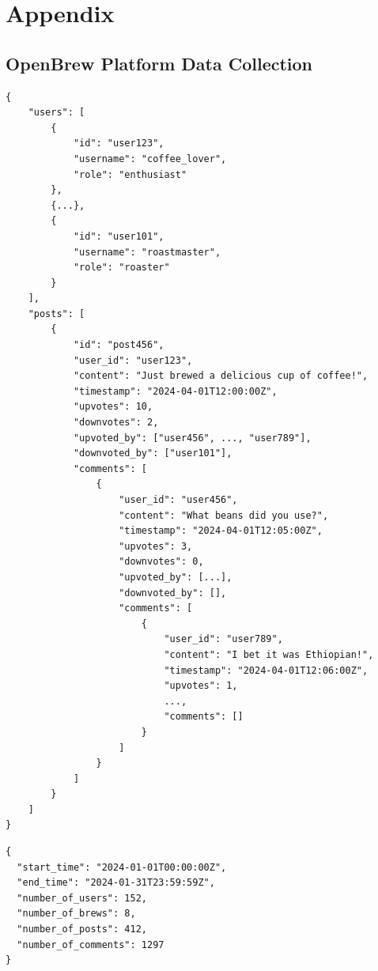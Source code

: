 \section{Appendix}
\label{sec:appendix}


\subsection{OpenBrew Platform Data Collection}
\label{sec:openbrew_platform_data_collection}

\begin{lstlisting}[caption={Example of collected platform data}, label={lst:openbrew_data}, basicstyle=\ttfamily\footnotesize, frame=single, backgroundcolor=\color{gray!10}, breaklines=true]
{
    "users": [
        {
            "id": "user123",
            "username": "coffee_lover",
            "role": "enthusiast"
        },
        {...},
        {
            "id": "user101",
            "username": "roastmaster",
            "role": "roaster"
        }
    ],
    "posts": [
        {
            "id": "post456",
            "user_id": "user123",
            "content": "Just brewed a delicious cup of coffee!",
            "timestamp": "2024-04-01T12:00:00Z",
            "upvotes": 10,
            "downvotes": 2,
            "upvoted_by": ["user456", ..., "user789"],
            "downvoted_by": ["user101"],
            "comments": [
                {
                    "user_id": "user456",
                    "content": "What beans did you use?",
                    "timestamp": "2024-04-01T12:05:00Z",
                    "upvotes": 3,
                    "downvotes": 0,
                    "upvoted_by": [...],
                    "downvoted_by": [],
                    "comments": [
                        {
                            "user_id": "user789",
                            "content": "I bet it was Ethiopian!",
                            "timestamp": "2024-04-01T12:06:00Z",
                            "upvotes": 1,
                            ...,
                            "comments": []
                        }
                    ]
                }
            ]
        }
    ]
}
\end{lstlisting}

\newpage
\begin{lstlisting}[caption={Example output from the basic statistics API}, label={lst:openbrew_basic_stats}, basicstyle=\ttfamily\footnotesize, frame=single, backgroundcolor=\color{gray!10}, breaklines=true]
{
  "start_time": "2024-01-01T00:00:00Z",
  "end_time": "2024-01-31T23:59:59Z",
  "number_of_users": 152,
  "number_of_brews": 8,
  "number_of_posts": 412,
  "number_of_comments": 1297
}
\end{lstlisting}

